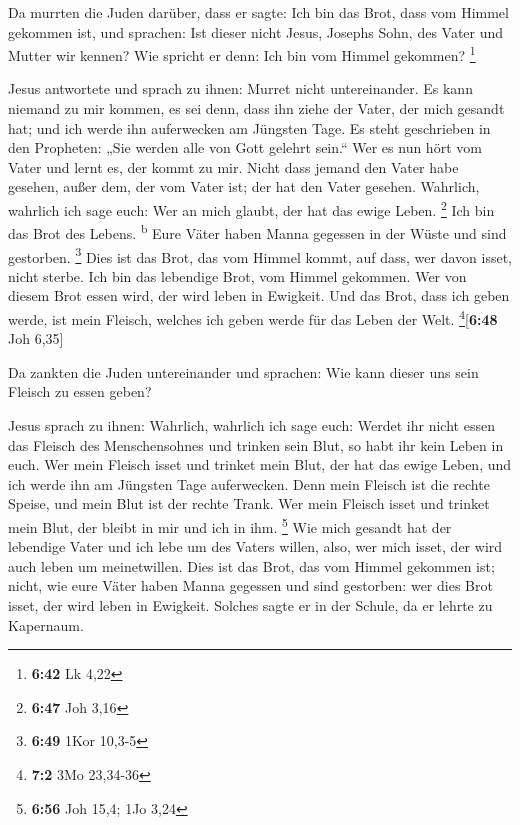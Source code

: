  Da murrten die Juden darüber, dass er sagte: Ich bin das
Brot, dass vom Himmel gekommen ist,  und sprachen: Ist
dieser nicht Jesus, Josephs Sohn, des Vater und Mutter wir kennen? Wie
spricht er denn: Ich bin vom Himmel gekommen? \footnote{\textbf{6:42} Lk
  4,22}

 Jesus antwortete und sprach zu ihnen: Murret nicht
untereinander.  Es kann niemand zu mir kommen, es sei
denn, dass ihn ziehe der Vater, der mich gesandt hat; und ich werde ihn
auferwecken am Jüngsten Tage.  Es steht geschrieben in
den Propheten: „Sie werden alle von Gott gelehrt sein.`` Wer es nun hört
vom Vater und lernt es, der kommt zu mir.  Nicht dass
jemand den Vater habe gesehen, außer dem, der vom Vater ist; der hat den
Vater gesehen.  Wahrlich, wahrlich ich sage euch: Wer an
mich glaubt, der hat das ewige Leben. \footnote{\textbf{6:47} Joh 3,16}
 Ich bin das Brot des Lebens. \textsuperscript{b}
 Eure Väter haben Manna gegessen in der Wüste und sind
gestorben. \footnote{\textbf{6:49} 1Kor 10,3-5}  Dies ist
das Brot, das vom Himmel kommt, auf dass, wer davon isset, nicht sterbe.
 Ich bin das lebendige Brot, vom Himmel gekommen. Wer von
diesem Brot essen wird, der wird leben in Ewigkeit. Und das Brot, dass
ich geben werde, ist mein Fleisch, welches ich geben werde für das Leben
der Welt. \footnote{\textbf{7:2} 3Mo 23,34-36}{[}\textbf{6:48} Joh
6,35{]}

 Da zankten die Juden untereinander und sprachen: Wie
kann dieser uns sein Fleisch zu essen geben?

 Jesus sprach zu ihnen: Wahrlich, wahrlich ich sage euch:
Werdet ihr nicht essen das Fleisch des Menschensohnes und trinken sein
Blut, so habt ihr kein Leben in euch.  Wer mein Fleisch
isset und trinket mein Blut, der hat das ewige Leben, und ich werde ihn
am Jüngsten Tage auferwecken.  Denn mein Fleisch ist die
rechte Speise, und mein Blut ist der rechte Trank.  Wer
mein Fleisch isset und trinket mein Blut, der bleibt in mir und ich in
ihm. \footnote{\textbf{6:56} Joh 15,4; 1Jo 3,24}  Wie
mich gesandt hat der lebendige Vater und ich lebe um des Vaters willen,
also, wer mich isset, der wird auch leben um meinetwillen.
 Dies ist das Brot, das vom Himmel gekommen ist; nicht,
wie eure Väter haben Manna gegessen und sind gestorben: wer dies Brot
isset, der wird leben in Ewigkeit.  Solches sagte er in
der Schule, da er lehrte zu Kapernaum.

